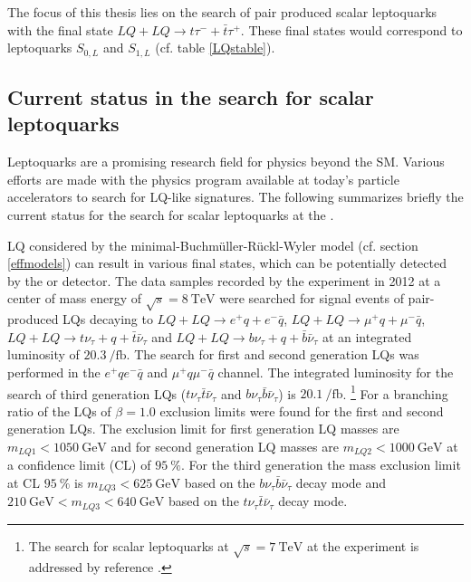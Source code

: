 %
The focus of this thesis lies on the search of pair produced scalar leptoquarks with the final state $LQ+LQ\rightarrow t\tau^{-}+\bar{t}\tau^{+}$. These final states would correspond to leptoquarks $S_{0,L}$ and $S_{1,L}$ (cf. table \ref{LQstable}). 
%
%
%
\subsection{Current status in the search for scalar leptoquarks}\label{currentStatus}
Leptoquarks are a promising research field for physics beyond the SM. Various efforts are made with the physics program available at today's particle accelerators to search for LQ-like signatures. The following summarizes briefly the current status for the search for scalar leptoquarks at the {\LHC}.\par
LQ considered by the minimal-Buchm\"{u}ller-R\"{u}ckl-Wyler model (cf. section \ref{effmodels}) can result in various final states, which can be potentially detected by the {\ATLAS} or {\CMS} detector.\newline
The data samples recorded by the {\ATLAS} experiment in 2012 at a center of mass energy of $\sqrt{s}=\SI{8}{\tera\electronvolt}$ were searched for signal events of pair-produced LQs decaying to $LQ+LQ\rightarrow e^+q+e^-\bar{q}$, $LQ+LQ\rightarrow \mu^+q+\mu^-\bar{q}$, $LQ+LQ\rightarrow t\nu_\tau+q+\bar{t}\bar{\nu}_\tau$ and $LQ+LQ\rightarrow b\nu_\tau+q+\bar{b}\bar{\nu}_\tau$ at an integrated luminosity of $\SI{20.3}{\per\femto\barn}$. The search for first and second generation LQs was performed in the $e^+qe^-\bar{q}$ and $\mu^+q\mu^-\bar{q}$ channel. The integrated luminosity for the search of third generation LQs ($t\nu_\tau\bar{t}\bar{\nu}_\tau$ and $b\nu_\tau\bar{b}\bar{\nu}_\tau$) is $\SI{20.1}{\per\femto\barn}$. \cite{currentStatus:8TeVATLAS}\footnote{The search for scalar leptoquarks at $\sqrt{s}=\SI{7}{\tera\electronvolt}$ at the {\ATLAS} experiment is addressed by reference \cite{currentStatus:7TeVATLAS}.} For a branching ratio of the LQs of $\beta=1.0$ exclusion limits were found for the first and second generation LQs. The exclusion limit for first generation LQ masses are $m_{LQ1}<\SI{1050}{\giga\electronvolt}$ and for second generation LQ masses are $m_{LQ2}<\SI{1000}{\giga\electronvolt}$ at a confidence limit (CL) of $\SI{95}{\percent}$. For the third generation the mass exclusion limit at CL $\SI{95}{\percent}$ is $m_{LQ3}<\SI{625}{\giga\electronvolt}$ based on the $b\nu_\tau\bar{b}\bar{\nu}_\tau$ decay mode and $\SI{210}{\giga\electronvolt}<m_{LQ3}<\SI{640}{\giga\electronvolt}$ based on the $t\nu_\tau\bar{t}\bar{\nu}_\tau$ decay mode. \cite{currentStatus:8TeVATLAS}\par
